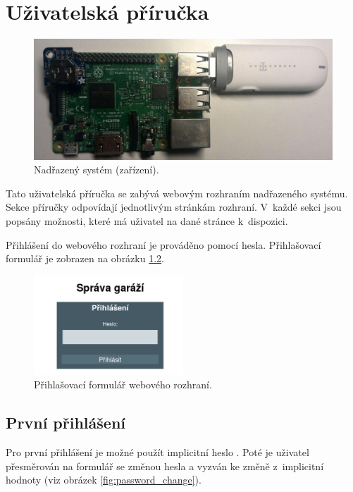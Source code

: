 \chapter{Uživatelská příručka}
\label{sec:guide}

\begin{figure}[h!]
    \centering
    \includegraphics[width=\textwidth]{images/rpi_device.jpg}
    \caption[Nadřazený systém (zařízení)]{Nadřazený systém (zařízení).}
    \label{fig:rpi_device}
\end{figure}

Tato uživatelská příručka se zabývá webovým rozhraním nadřazeného systému. Sekce příručky odpovídají jednotlivým stránkám rozhraní. V~každé sekci jsou popsány možnosti, které má uživatel na dané stránce k~dispozici.

Přihlášení do webového rozhraní je prováděno pomocí hesla. Přihlašovací formulář je zobrazen na obrázku \ref{fig:login}.

\begin{figure}[h!]
    \centering
    \includegraphics[width=0.5\textwidth]{images/login.png}
    \caption[Přihlašovací formulář webového rozhraní]{Přihlašovací formulář webového rozhraní.}
    \label{fig:login}
\end{figure}

\section{První přihlášení}

Pro první přihlášení je možné použít implicitní heslo . Poté je uživatel přesměrován na formulář se změnou hesla a vyzván ke změně z~implicitní hodnoty (viz obrázek \ref{fig:password_change}).

